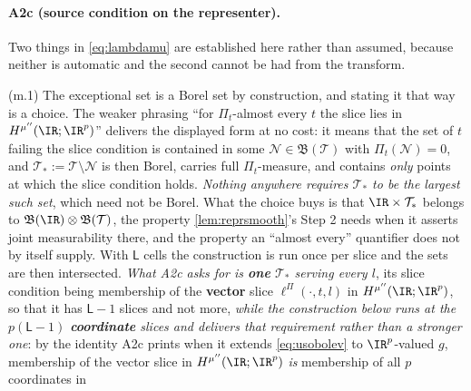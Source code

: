 \paragraph{A2c (source condition on the representer).}


Two things in \eqref{eq:lambdamu} are established here rather than assumed, because neither is
automatic and the second cannot be had from the transform.

\textup{(m.1)} The exceptional set is a Borel set by construction, and stating it that way is a
choice. The weaker phrasing ``for $\Pi_t$-almost every $t$ the slice lies in $H^{\mu''}(\IR;\IR^{p})$''
delivers
the displayed form at no cost: it means that the set of $t$ failing the slice condition is contained in
some $\mathcal N\in\mathfrak B(\mathcal T)$ with $\Pi_t(\mathcal N)=0$, and
$\mathcal T_\ast:=\mathcal T\setminus\mathcal N$ is then Borel, carries full $\Pi_t$-measure, and
contains \emph{only} points at which the slice condition holds. \emph{Nothing anywhere requires
$\mathcal T_\ast$ to be the largest such set}, which need not be Borel. What the choice buys is that
$\IR\times\mathcal T_\ast$ belongs to $\mathfrak B(\IR)\otimes\mathfrak B(\mathcal T)$, the property
\cref{lem:reprsmooth}'s Step 2 needs when it asserts joint measurability there, and the property an
``almost every'' quantifier does not by itself supply.
With $\mathsf L$ cells the construction is run once per slice and the sets are then intersected.
\emph{What A2c asks for is \textbf{one} $\mathcal T_\ast$ serving every $l$}, its slice condition
being membership of the \textbf{vector} slice $\ell^\Pi(\cdot,t,l)$ in $H^{\mu''}(\IR;\IR^{p})$, so that
it has $\mathsf L-1$ slices and not more, \emph{while the construction below runs at the
$p(\mathsf L-1)$ \textbf{coordinate} slices and delivers that requirement rather than a stronger one}:
by the identity A2c prints when it extends \eqref{eq:usobolev} to $\IR^{p}$-valued $g$, membership of
the vector slice in $H^{\mu''}(\IR;\IR^{p})$ \emph{is} membership of all $p$ coordinates in
